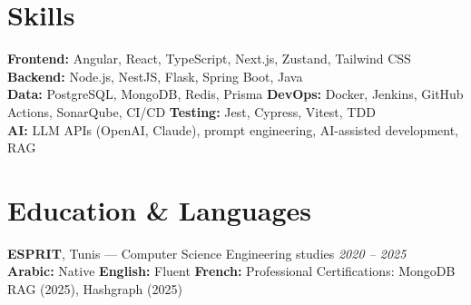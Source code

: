 \documentclass[10pt,a4paper]{article}
\begin{document}
\section*{Skills}
{\small
\textbf{Frontend:} Angular, React, TypeScript, Next.js, Zustand, Tailwind CSS \quad
\textbf{Backend:} Node.js, NestJS, Flask, Spring Boot, Java\\
\textbf{Data:} PostgreSQL, MongoDB, Redis, Prisma \quad
\textbf{DevOps:} Docker, Jenkins, GitHub Actions, SonarQube, CI/CD \quad
\textbf{Testing:} Jest, Cypress, Vitest, TDD\\
\textbf{AI:} LLM APIs (OpenAI, Claude), prompt engineering, AI-assisted development, RAG

}

\section*{Education \& Languages}
{\small
\textbf{ESPRIT}, Tunis --- Computer Science Engineering studies \hfill {\color{gray}\textit{2020 -- 2025}}\\[1pt]
\textbf{Arabic:} Native \quad \textbf{English:} Fluent \quad \textbf{French:} Professional \quad
Certifications: MongoDB RAG (2025), Hashgraph (2025)
}
\end{document}
